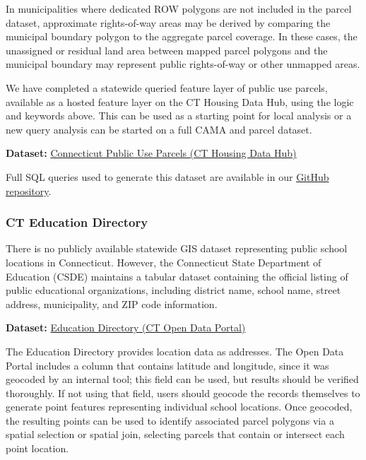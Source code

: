 \documentclass[
  letterpaper,
  DIV=11,
  numbers=noendperiod]{scrreprt}
\begin{document}
In municipalities where dedicated ROW polygons are not included in the
parcel dataset, approximate rights-of-way areas may be derived by
comparing the municipal boundary polygon to the aggregate parcel
coverage. In these cases, the unassigned or residual land area between
mapped parcel polygons and the municipal boundary may represent public
rights-of-way or other unmapped areas.

\begin{tcolorbox}[enhanced jigsaw, arc=.35mm, bottomrule=.15mm, breakable, colback=white, colframe=quarto-callout-note-color-frame, left=2mm, leftrule=.75mm, opacityback=0, rightrule=.15mm, toprule=.15mm]

We have completed a statewide queried feature layer of public use
parcels, available as a hosted feature layer on the CT Housing Data Hub,
using the logic and keywords above. This can be used as a starting point
for local analysis or a new query analysis can be started on a full CAMA
and parcel dataset.

\textbf{Dataset:}
\href{https://housingmaps.ct.gov/datasets/ctmaps::connecticut-public-use-parcels-/about}{Connecticut
Public Use Parcels (CT Housing Data Hub)}

Full SQL queries used to generate this dataset are available in our
\href{https://github.com/ctgisoffice/housing/blob/main/SQL_Public_Use_Parcels.sql}{GitHub
repository}.

\end{tcolorbox}

\subsubsection{CT Education Directory}\label{sec-ct-education-directory}

There is no publicly available statewide GIS dataset representing public
school locations in Connecticut. However, the Connecticut State
Department of Education (CSDE) maintains a tabular dataset containing
the official listing of public educational organizations, including
district name, school name, street address, municipality, and ZIP code
information.

\textbf{Dataset:}
\href{https://data.ct.gov/Education/Education-Directory/9k2y-kqxn/about_data}{Education
Directory (CT Open Data Portal)}

The Education Directory provides location data as addresses. The Open
Data Portal includes a column that contains latitude and longitude,
since it was geocoded by an internal tool; this field can be used, but
results should be verified thoroughly. If not using that field, users
should geocode the records themselves to generate point features
representing individual school locations. Once geocoded, the resulting
points can be used to identify associated parcel polygons via a spatial
selection or spatial join, selecting parcels that contain or intersect
each point location.
\end{document}

